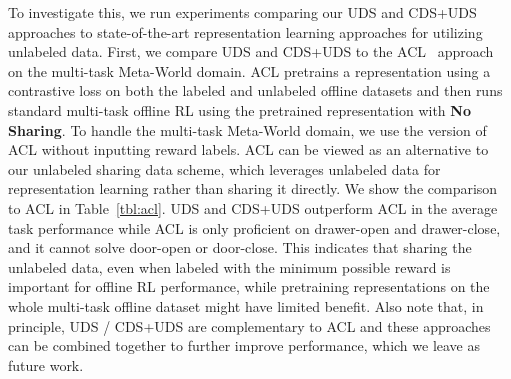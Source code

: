 To investigate this, we run experiments comparing our UDS and CDS+UDS approaches to state-of-the-art representation learning approaches for utilizing unlabeled data. First, we compare UDS and CDS+UDS to the ACL~\citep{yang2021representation} approach on the multi-task Meta-World domain. ACL pretrains a representation using a contrastive loss on both the labeled and unlabeled offline datasets and then runs standard multi-task offline RL using the pretrained representation with \textbf{No Sharing}. To handle the multi-task Meta-World domain, we use the version of ACL without inputting reward labels. ACL can be viewed as an alternative to our unlabeled sharing data scheme, which leverages unlabeled data for representation learning rather than sharing it directly. We show the comparison to ACL in Table~\ref{tbl:acl}. UDS and CDS+UDS outperform ACL in the average task performance while ACL is only proficient on drawer-open and drawer-close, and it cannot solve door-open or door-close. This indicates that sharing the unlabeled data, even when labeled with the minimum possible reward is important for offline RL performance, while pretraining representations on the whole multi-task offline dataset might have limited benefit. Also note that, in principle, UDS / CDS+UDS are complementary to ACL and these approaches can be combined together to further improve performance, which we leave as future work.

\begin{table}[t]
\centering
{}
\vspace{-0.2cm}
\caption{\footnotesize Comparison between \textbf{UDS} / \textbf{CDS+UDS} and the \textbf{ACL}~\citep{yang2021representation} that performs representation learning on the unlabeled data instead of data sharing. Both \textbf{UDS} and \textbf{CDS+UDS} outperform \textbf{ACL} by a significant margin in the average task result, suggesting that sharing the unlabeled data is crucial in improving the performance of multi-task offline RL with unlabeled data compared to only using the data for learning the representation.}
\label{tbl:acl}
\vspace{-0.2cm}
\normalsize
\end{table}


